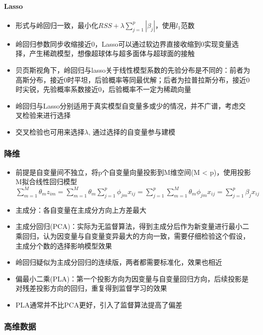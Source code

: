 \documentclass[]{book}
\providecommand{\tightlist}{%
  \setlength{\itemsep}{0pt}\setlength{\parskip}{0pt}}
\let\oldparagraph\paragraph
\renewcommand{\paragraph}[1]{\oldparagraph{#1}\mbox{}}
\begin{document}
\hypertarget{lasso}{%
\paragraph{Lasso}\label{lasso}}

\begin{itemize}
\tightlist
\item
  形式与岭回归一致，最小化\(RSS + \lambda \sum_{j = 1}^{p} |\beta_j|\)，使用\(l_1\)范数
\item
  岭回归参数同步收缩接近0，Lasso可以通过软边界直接收缩到0实现变量选择，产生稀疏模型，想像超球体与超多面体与超球面的接触
\item
  贝页斯视角下，岭回归与lasso关于线性模型系数的先验分布是不同的：前者为高斯分布，接近0时平坦，后验概率等同最优解；后者为拉普拉斯分布，接近0时尖锐，先验概率系数接近0，后验概率不一定为稀疏向量
\item
  岭回归与Lasso分别适用于真实模型自变量多或少的情况，并不广谱，考虑交叉检验来进行选择
\item
  交叉检验也可用来选择\(\lambda\), 通过选择的自变量参与建模
\end{itemize}

\subsubsection{降维}

\begin{itemize}
\tightlist
\item
  前提是自变量间不独立，将p个自变量向量投影到M维空间(M \textless{} p)，使用投影M拟合线性回归模型 \(\sum_{m = 1}^{M}\theta_m z_{im} = \sum_{m = 1}^{M} \theta_m \sum_{j = 1}^{p} \phi_{jm}x_{ij} = \sum_{j = 1}^p \sum_{m = 1}^{M} \theta_m \phi_{jm} x_{ij} = \sum_{j = 1}^{p} \beta_j x_{ij}\)
\item
  主成分：各自变量在主成分方向上方差最大
\item
  主成分回归(PCA)：实际为无监督算法，得到主成分后作为新变量进行最小二乘回归，认为因变量与自变量变异最大的方向一致，需要仔细检验这个假设，主成分个数的选择影响模型效果
\item
  岭回归疑似为主成分回归的连续版，两者都需要标准化，效果也相近
\item
  偏最小二乘(PLA)：第一个投影方向为因变量与自变量回归方向，后续投影是对残差投影方向的回归，重复得到监督学习的效果
\item
  PLA通常并不比PCA更好，引入了监督算法提高了偏差
\end{itemize}

\subsubsection{高维数据}
\end{document}
